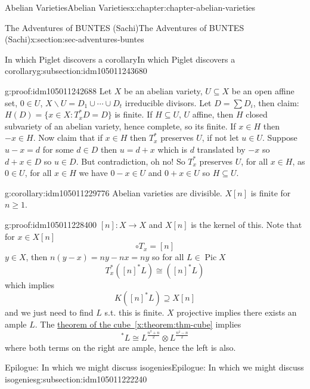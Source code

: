 \documentclass[oneside,10pt,]{book}
\numberwithin{equation}{section}
\DeclareMathOperator{\Pic}{Pic}
\begin{document}
\begin{chapterptx}{Abelian Varieties}{}{Abelian Varieties}{}{}{x:chapter:chapter-abelian-varieties}
\begin{sectionptx}{The Adventures of BUNTES (Sachi)}{}{The Adventures of BUNTES (Sachi)}{}{}{x:section:sec-adventures-buntes}
\begin{subsectionptx}{In which Piglet discovers a corollary}{}{In which Piglet discovers a corollary}{}{}{g:subsection:idm105011243680}
\begin{proofptx}{}{g:proof:idm105011242688}
Let \(X\) be an abelian variety, \(U \subseteq X\) be an open affine set, \(0\in U\), \(X\smallsetminus U = D_1 \cup \cdots \cup D_t\) irreducible divisors. Let \(D = \sum D_i\), then claim: \(H(D) = \{x\in X: T_x^*D  = D \}\) is finite. If \(H\subseteq U\), \(U\) affine, then \(H\) closed subvariety of an abelian variety, hence complete, so its finite. If \(x\in H\) then \(-x \in H\). Now claim that if \(x\in H\) then \(T_x^*\) preserves \(U\), if not let \(u\in U\). Suppose \(u-x = d\) for some \(d\in D\) then \(u = d+x\) which is \(d\) translated by \(-x\) so \(d+x \in D\) so \(u\in D\). But contradiction, oh no! So \(T_x^*\) preserves \(U\), for all \(x\in H\), as \(0 \in U\), for all \(x\in H\) we have \(0-x \in U\) and  \(0+x\in U\) so \(H\subseteq U\).%
\end{proofptx}
\begin{corollary}{}{}{g:corollary:idm105011229776}%
Abelian varieties are divisible. \(X[n]\) is finite for \(n\ge 1\).%
\end{corollary}
\begin{proofptx}{}{g:proof:idm105011228400}
\([n]\colon X \to X\) and \(X[n]\) is the kernel of this. Note that for \(x\in X[n]\)%
\begin{equation*}
[n]\circ T_x = [n]
\end{equation*}
\(y\in X\), then \(n(y-x) = ny - nx = ny\) so for all \(L \in \Pic X\)%
\begin{equation*}
T_x^*([n]^* L ) \cong ([n]^* L)
\end{equation*}
which implies%
\begin{equation*}
K([n]^* L ) \supseteq X[n]
\end{equation*}
and we just need to find \(L\) s.t. this is finite. \(X\) projective implies there exists an ample \(L\). The \hyperref[x:theorem:thm-cube]{theorem of the cube~\ref{x:theorem:thm-cube}} implies%
\begin{equation*}
[n]^*L \cong L^{\frac{n^2 + n}{2}} \otimes L^{\frac{n^2 - n}{2}}
\end{equation*}
where both terms on the right are ample, hence the left is also.%
\end{proofptx}
\end{subsectionptx}
%
%
\typeout{************************************************}
\typeout{************************************************}
%
\begin{subsectionptx}{Epilogue: In which we might discuss isogenies}{}{Epilogue: In which we might discuss isogenies}{}{}{g:subsection:idm105011222240}

\end{subsectionptx}
\end{sectionptx}
\end{chapterptx}
\end{document}

